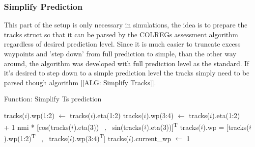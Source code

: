 \subsubsection*{Simplify Prediction}
This part of the setup is only necessary in simulations, the idea is to prepare the tracks struct so that it can be parsed by the COLREGs assessment algorithm
regardless of desired prediction level. Since it is much easier to truncate excess waypoints and 'step down' from full prediction to simple, than the other way around, the algorithm
was developed with full prediction level as the standard. If it's desired to step down to a simple prediction level the tracks simply need to be parsed though algorithm [\ref{ALG: Simplify Tracks}].


\begin{algorithm}[ht]
    \caption{Function: Simplify \gls{Ts} prediction} \label{ALG: Simplify Tracks}
    \begin{algorithmic}
                \State tracks($i$).wp(1:2) $\gets$ tracks($i$).eta(1:2)
                \State tracks($i$).wp(3:4) $\gets$ tracks($i$).eta(1:2) \\ \hfill + 1 nmi * [cos(tracks($i$).eta(3)) \ , \ sin(tracks($i$).eta(3))]\textsuperscript{T}
                \State tracks($i$).wp = [tracks($i$).wp(1:2)\textsuperscript{T} \ , \ tracks($i$).wp(3:4)\textsuperscript{T}]
                \State tracks($i$).current\_wp $\gets$ 1
            \EndIf
        \EndFor
    \end{algorithmic}
\end{algorithm}



